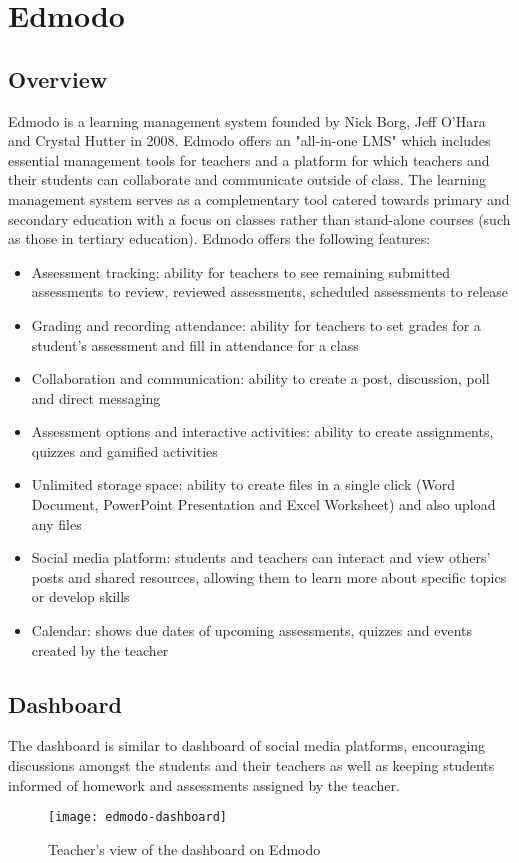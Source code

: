 \section{Edmodo}
\subsection{Overview}
Edmodo is a learning management system founded by Nick Borg, Jeff O'Hara and Crystal Hutter in 2008. Edmodo offers an "all-in-one LMS" which includes essential management tools for teachers and a platform for which teachers and their students can collaborate and communicate outside of class. The learning management system serves as a complementary tool catered towards primary and secondary education with a focus on classes rather than stand-alone courses (such as those in tertiary education). Edmodo offers the following features:
\begin{itemize}
    \item Assessment tracking: ability for teachers to see remaining submitted assessments to review, reviewed assessments, scheduled assessments to release
    \item Grading and recording attendance: ability for teachers to set grades for a student's assessment and fill in attendance for a class
    \item Collaboration and communication: ability to create a post, discussion, poll and direct messaging
    \item Assessment options and interactive activities: ability to create assignments, quizzes and gamified activities
    \item Unlimited storage space: ability to create files in a single click (Word Document, PowerPoint Presentation and Excel Worksheet) and also upload any files
    \item Social media platform: students and teachers can interact and view others' posts and shared resources, allowing them to learn more about specific topics or develop skills
    \item Calendar: shows due dates of upcoming assessments, quizzes and events created by the teacher
\end{itemize}

\subsection{Dashboard}
The dashboard is similar to dashboard of social media platforms, encouraging discussions amongst the students and their teachers as well as keeping students informed of homework and assessments assigned by the teacher.
\begin{figure}
\centering
\texttt{[image: edmodo-dashboard]}
\caption{Teacher's view of the dashboard on Edmodo}
\end{figure}


